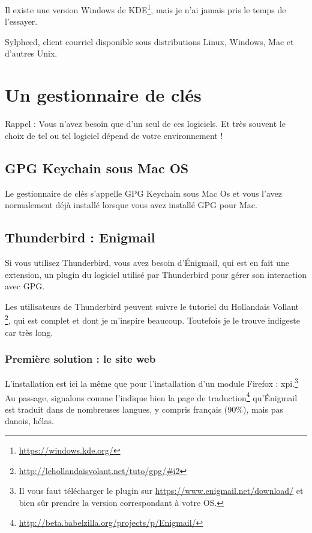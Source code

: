 Il existe une version Windows de KDE\footnote{\url{https://windows.kde.org/}},
mais je n'ai jamais pris le temps de l'essayer.

Sylpheed, client courriel disponible sous distributions Linux, Windows,
Mac et d'autres Unix.

\section{Un gestionnaire de clés}\label{un-gestionnaire-de-cluxe9s}

\begin{notice}
Rappel : Vous n'avez besoin que d'un seul de ces logiciels. Et très
souvent le choix de tel ou tel logiciel dépend de votre environnement !
\end{notice}

\subsection{GPG Keychain sous Mac OS}\label{gpg-keychain-sous-mac-os}

Le gestionnaire de clés s'appelle GPG Keychain sous Mac Os et vous
l'avez normalement déjà installé lorsque vous avez installé GPG pour
Mac.

\subsection{Thunderbird : Enigmail}\label{thunderbird-enigmail}

Si vous utilisez Thunderbird, vous avez besoin d'Énigmail, qui est en
fait une extension, un plugin du logiciel utilisé par Thunderbird pour
gérer son interaction avec GPG.

Les utilisateurs de Thunderbird peuvent suivre le tutoriel du Hollandais Vollant
\footnote{\url{http://lehollandaisvolant.net/tuto/gpg/\#i2}}, qui est
complet et dont je m'inspire beaucoup. Toutefois je le trouve indigeste
car très long.

\subsubsection{Première solution : le site web}\label{premiuxe8re-solution-le-site-web}

L'installation est ici la même que pour l'installation d'un module
Firefox : xpi.\footnote{Il vous faut télécharger le plugin sur
\url{https://www.enigmail.net/download/} et bien sûr
prendre la version correspondant à votre OS.} 
Au passage, signalons comme l'indique bien
la page de traduction\footnote{\url{http://beta.babelzilla.org/projects/p/Enigmail/}} qu'Énigmail est traduit dans de nombreuses langues, y
compris français (90\%), mais pas danois, hélas.

